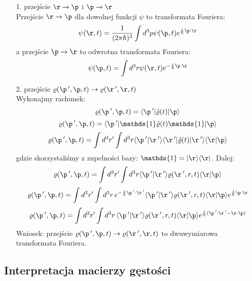 \begin{itemize}
\item[1.] przejście $\r\rightarrow\p$ i  $\p\rightarrow\r$\\
Przejście $\r\rightarrow\p$ dla dowolnej funkcji $\psi$ to transformata Fouriera:
\begin{equation}\psi(\r,t)=\frac{1}{(2\pi\hbar)^3}\int d^3p\psi(\p,t)e^{\frac{i}{\hbar}\p\cdot\r}\end{equation}
a przejście $\p\rightarrow\r$ to odwrotna transformata Fouriera:
\begin{equation}\psi(\p,t)=\int d^3r\psi(\r,t)e^{-\frac{i}{\hbar}\p\cdot\r}
\end{equation}
\item[2.] przejście $\varrho(\p\,',\p,t)\rightarrow\varrho(\r\,',\r,t)$\\
Wykonajmy rachunek:
\begin{equation}\varrho(\p\,',\p,t)=\langle\p\,'|\hat{\varrho}(t)|\p\rangle\end{equation}
\begin{equation}\varrho(\p\,',\p,t)=\langle\p\,'|\mathds{1}\hat{\varrho}(t)\mathds{1}|\p\rangle
\end{equation}
\begin{equation}
\varrho(\p\,',\p,t)=\int d^3r'\int d^3r\langle\p\,'|\r\,'\rangle
\langle \r\,'|\hat{\varrho}(t)|\r\,'\rangle\langle\r|\p\rangle
\end{equation}
gdzie skorzystaliśmy z zupełności bazy: $\mathds{1}=|\r\rangle\langle\r|$. Dalej:
\begin{equation}
\varrho(\p\,',\p,t)=\int d^3r'\int d^3r\langle\p\,'|\r\,'\rangle
\varrho(\r\,',r,t)\langle\r|\p\rangle
\end{equation}
\begin{equation}
\varrho(\p\,',\p,t)=\int d^3r'\int d^3r\, e^{-\frac{i}{\hbar}\p\,'\cdot\r\,'}\langle\p\,'|\r\,'\rangle
\varrho(\r\,',r,t)\langle\r|\p\rangle e^{\frac{i}{\hbar}\p\cdot\r}
\end{equation}
\begin{equation}
\varrho(\p\,',\p,t)=\int d^3r'\int d^3r\,\langle\p\,'|\r\,'\rangle
\varrho(\r\,',r,t)\langle\r|\p\rangle e^{\frac{i}{\hbar}(\p\,'\cdot\r\,'-\r\cdot\p)}
\end{equation}
Wniosek: przejście  $\varrho(\p\,',\p,t)\rightarrow\varrho(\r\,',\r,t)$ to dwuwymiarowa transformata Fouriera.
\end{itemize}
\subsection{Interpretacja macierzy gęstości}
